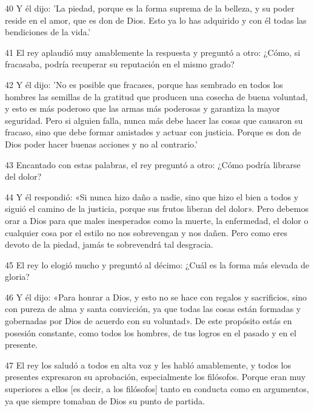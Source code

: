 \par 40 Y él dijo: 'La piedad, porque es la forma suprema de la belleza, y su poder reside en el amor, que es don de Dios. Esto ya lo has adquirido y con él todas las bendiciones de la vida.'

\par 41 El rey aplaudió muy amablemente la respuesta y preguntó a otro: ¿Cómo, si fracasaba, podría recuperar su reputación en el mismo grado?

\par 42 Y él dijo: 'No es posible que fracases, porque has sembrado en todos los hombres las semillas de la gratitud que producen una cosecha de buena voluntad, y esto es más poderoso que las armas más poderosas y garantiza la mayor seguridad. Pero si alguien falla, nunca más debe hacer las cosas que causaron su fracaso, sino que debe formar amistades y actuar con justicia. Porque es don de Dios poder hacer buenas acciones y no al contrario.'

\par 43 Encantado con estas palabras, el rey preguntó a otro: ¿Cómo podría librarse del dolor?

\par 44 Y él respondió: «Si nunca hizo daño a nadie, sino que hizo el bien a todos y siguió el camino de la justicia, porque sus frutos liberan del dolor». Pero debemos orar a Dios para que males inesperados como la muerte, la enfermedad, el dolor o cualquier cosa por el estilo no nos sobrevengan y nos dañen. Pero como eres devoto de la piedad, jamás te sobrevendrá tal desgracia.

\par 45 El rey lo elogió mucho y preguntó al décimo: ¿Cuál es la forma más elevada de gloria?

\par 46 Y él dijo: «Para honrar a Dios, y esto no se hace con regalos y sacrificios, sino con pureza de alma y santa convicción, ya que todas las cosas están formadas y gobernadas por Dios de acuerdo con su voluntad». De este propósito estás en posesión constante, como todos los hombres, de tus logros en el pasado y en el presente.

\par 47 El rey los saludó a todos en alta voz y les habló amablemente, y todos los presentes expresaron su aprobación, especialmente los filósofos. Porque eran muy superiores a ellos [es decir, a los filósofos] tanto en conducta como en argumentos, ya que siempre tomaban de Dios su punto de partida.

